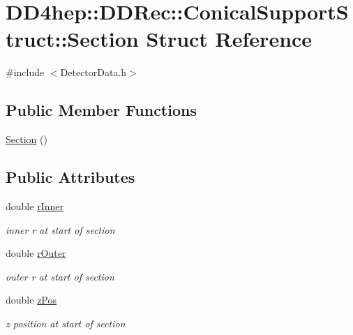 \hypertarget{struct_d_d4hep_1_1_d_d_rec_1_1_conical_support_struct_1_1_section}{
\section{DD4hep::DDRec::ConicalSupportStruct::Section Struct Reference}
\label{struct_d_d4hep_1_1_d_d_rec_1_1_conical_support_struct_1_1_section}
}


{\ttfamily \#include $<$DetectorData.h$>$}\subsection*{Public Member Functions}
\begin{DoxyCompactItemize}
\item 
\hyperlink{struct_d_d4hep_1_1_d_d_rec_1_1_conical_support_struct_1_1_section_a01a1dcdce026423d946fae269b6a99de}{Section} ()
\end{DoxyCompactItemize}
\subsection*{Public Attributes}
\begin{DoxyCompactItemize}
\item 
double \hyperlink{struct_d_d4hep_1_1_d_d_rec_1_1_conical_support_struct_1_1_section_a9affb6ab8e0306b5c87a794adede9c32}{rInner}
\begin{DoxyCompactList}\small\item\em inner r at start of section \item\end{DoxyCompactList}\item 
double \hyperlink{struct_d_d4hep_1_1_d_d_rec_1_1_conical_support_struct_1_1_section_a2bf73928a0b64cdbc0b58f724c90126a}{rOuter}
\begin{DoxyCompactList}\small\item\em outer r at start of section \item\end{DoxyCompactList}\item 
double \hyperlink{struct_d_d4hep_1_1_d_d_rec_1_1_conical_support_struct_1_1_section_a078b08f486bacca5f6de87ac1bba2b97}{zPos}
\begin{DoxyCompactList}\small\item\em z position at start of section \item\end{DoxyCompactList}\end{DoxyCompactItemize}


